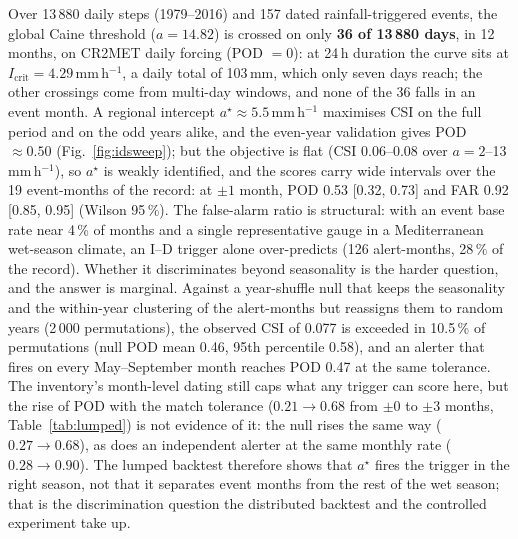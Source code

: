 \documentclass[authoryear,preprint,review,12pt]{elsarticle}
\begin{document}
Over 13\,880 daily steps (1979--2016) and 157 dated rainfall-triggered events, the
global Caine threshold ($a=14.82$) is crossed on only \textbf{36 of 13\,880 days}, in 12 months, on CR2MET daily forcing
(POD $=0$): at 24\,h duration the curve sits at $I_{\mathrm{crit}}=4.29$\,mm\,h$^{-1}$, a daily
total of 103\,mm, which only seven days reach; the other crossings come from
multi-day windows, and none of the 36 falls in an event month. A regional intercept $a^\star\approx5.5$\,mm\,h$^{-1}$
maximises CSI on the full period and on the odd years alike, and the even-year
validation gives POD $\approx 0.50$ (Fig.~\ref{fig:idsweep}); but the objective is
flat (CSI 0.06--0.08 over $a=2$--13\,mm\,h$^{-1}$), so $a^\star$ is weakly
identified, and the scores carry wide intervals over the 19 event-months of the
record: at $\pm1$ month, POD 0.53 [0.32, 0.73] and FAR 0.92 [0.85, 0.95]
(Wilson 95\,\%). The false-alarm ratio is structural: with an event base rate near 4\,\% of months and a
single representative gauge in a Mediterranean wet-season climate, an I--D trigger
alone over-predicts (126 alert-months, 28\,\% of the record). Whether it
discriminates beyond seasonality is the harder question, and the answer is marginal.
Against a year-shuffle null that keeps the seasonality and the within-year
clustering of the alert-months but reassigns them to random years (2\,000
permutations), the observed CSI of 0.077 is exceeded in 10.5\,\% of permutations
(null POD mean 0.46, 95th percentile 0.58), and an alerter that fires on every
May--September month reaches POD 0.47 at the same tolerance. The inventory's
month-level dating still caps what any trigger can score here, but the rise of
POD with the match tolerance ($0.21\to0.68$ from $\pm0$ to $\pm3$ months,
Table~\ref{tab:lumped}) is not evidence of it: the null rises the same way
($0.27\to0.68$), as does an independent alerter at the same monthly rate
($0.28\to0.90$). The lumped backtest therefore shows that $a^\star$ fires the
trigger in the right season, not that it separates event months from the rest of
the wet season; that is the discrimination question the distributed backtest and
the controlled experiment take up.
\end{document}
